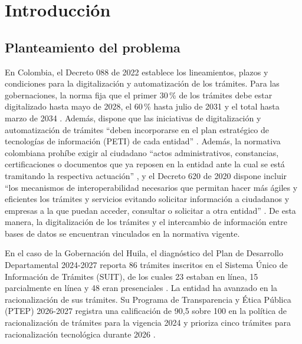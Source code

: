 
\section{Introducción}

\subsection{Planteamiento del problema}

En Colombia, el Decreto 088 de 2022 establece los lineamientos, plazos y condiciones para la digitalización y automatización de los trámites. Para las gobernaciones, la norma fija que el primer 30\,\% de los trámites debe estar digitalizado hasta mayo de 2028, el 60\,\% hasta julio de 2031 y el total hasta marzo de 2034 \parencite[art.~2.2.20.7]{colombia2022decreto088}. Además, dispone que las iniciativas de digitalización y automatización de trámites \enquote{deben incorporarse en el plan estratégico de tecnologías de información (PETI) de cada entidad} \parencite[Anexo 1, num.~2.3.2]{colombia2022decreto088}. Además, la normativa colombiana prohíbe exigir al ciudadano \enquote{actos administrativos, constancias, certificaciones o documentos que ya reposen en la entidad ante la cual se está tramitando la respectiva actuación} \parencite[art.~9]{colombia2012decreto019}, y el Decreto 620 de 2020 dispone incluir \enquote{los mecanismos de interoperabilidad necesarios que permitan hacer más ágiles y eficientes los trámites y servicios evitando solicitar información a ciudadanos y empresas a la que puedan acceder, consultar o solicitar a otra entidad} \parencite[art.~2.2.17.4.7, num.~8]{colombia2020decreto620}. De esta manera, la digitalización de los trámites y el intercambio de información entre bases de datos se encuentran vinculados en la normativa vigente.

En el caso de la Gobernación del Huila, el diagnóstico del Plan de Desarrollo Departamental 2024-2027 reporta 86 trámites inscritos en el Sistema Único de Información de Trámites (SUIT), de los cuales 23 estaban en línea, 15 parcialmente en línea y 48 eran presenciales \parencite[p.~32]{gobernaciondelhuila2024ordenanza}. La entidad ha avanzado en la racionalización de sus trámites. Su Programa de Transparencia y Ética Pública (PTEP) 2026-2027 registra una calificación de 90,5 sobre 100 en la política de racionalización de trámites para la vigencia 2024 \parencite[pp.~75, 134]{gobernaciondelhuila2026ptep} y prioriza cinco trámites para racionalización tecnológica durante 2026 \parencite[pp.~135-136]{gobernaciondelhuila2026ptep}.

